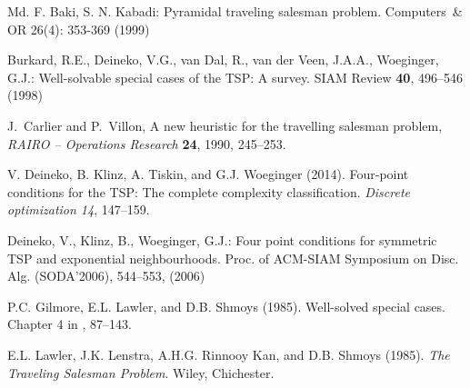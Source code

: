Md. F. Baki, S. N. Kabadi:
Pyramidal traveling salesman problem. Computers\ & OR 26(4): 353-369 (1999)



Burkard, R.E., Deineko, V.G., van Dal, R., van der Veen, J.A.A., Woeginger, G.J.: Well-solvable special cases of the TSP: A survey.
SIAM Review {\bf 40}, 496--546 (1998)


J.~Carlier and P.~Villon,
A new heuristic for the travelling salesman problem,
{\sl RAIRO -- Operations Research} {\bf 24}, 1990, 245--253.



{\sc V. Deineko, B. Klinz, A. Tiskin, and G.J. Woeginger} (2014). 
Four-point conditions for the TSP: The complete complexity classification. 
\emph{Discrete optimization 14}, 147--159.


Deineko, V., Klinz, B., Woeginger, G.J.: 
Four point conditions for symmetric TSP and exponential neighbourhoods. 
Proc. of ACM-SIAM Symposium on Disc. Alg. (SODA'2006), 544--553, (2006)
 
{\sc P.C. Gilmore, E.L. Lawler, and D.B. Shmoys} (1985).
Well-solved special cases. Chapter 4 in \cite{TSP}, 87--143.

{\sc E.L. Lawler, J.K. Lenstra, A.H.G. Rinnooy Kan, and D.B. Shmoys} (1985).
\emph{The Traveling Salesman Problem}.
Wiley, Chichester.

